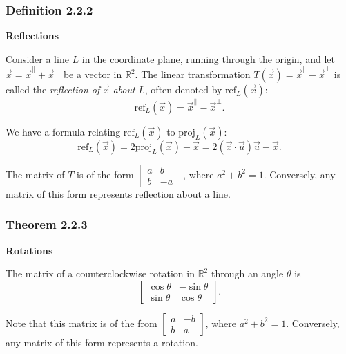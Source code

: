 \documentclass{report}
\begin{document}
\subsubsection*{Definition 2.2.2}
\par\noindent\textbf{Reflections}
\par\noindent Consider a line $L$ in the coordinate plane, running through the origin, and let $\vec{x}=\vec{x}^{\parallel}+\vec{x}^{\bot}$ be a vector in $\mathbb{R}^{2}$. The linear transformation $T(\vec{x})=\vec{x}^{\parallel}-\vec{x}^{\bot}$ is called the \textit{reflection of} $\vec{x}$ \textit{about} $L$, often denoted by $\textrm{ref}_{L}(\vec{x})$:
\[\textrm{ref}_{L}(\vec{x})=\vec{x}^{\parallel}-\vec{x}^{\bot}.\]
\par\noindent We have a formula relating $\textrm{ref}_{L}(\vec{x})$ to $\textrm{proj}_{L}(\vec{x})$:
\[\textrm{ref}_{L}(\vec{x})=2\textrm{proj}_{L}(\vec{x})-\vec{x}=2(\vec{x}\cdot\vec{u})\vec{u}-\vec{x}.\]
\par\noindent The matrix of $T$ is of the form $\displaystyle\left[\begin{array}{rr}a&b\\ b&-a\end{array}\right]$, where $a^{2}+b^{2}=1$. Conversely, any matrix of this form represents reflection about a line.
\subsubsection*{Theorem 2.2.3}
\par\noindent\textbf{Rotations}
\par\noindent The matrix of a counterclockwise rotation in $\mathbb{R}^{2}$ through an angle $\theta$ is
\[\left[\begin{array}{rr}\cos{}\theta{}&-\sin{}\theta{}\\ \sin{}\theta{}&\cos{}\theta{}\end{array}\right].\]
\par\noindent Note that this matrix is of the from $\displaystyle\left[\begin{array}{rr}a&-b\\ b&a\end{array}\right]$, where $a^{2}+b^{2}=1$. Conversely, any matrix of this form represents a rotation.
\end{document}
